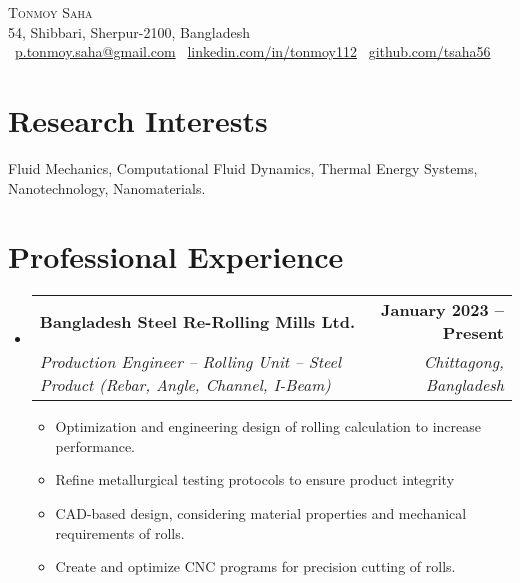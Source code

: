 \documentclass[letterpaper,11pt]{article}
\makeatletter
\newcommand{\resumeItem}[1]{
  \item\small{
    {#1 \vspace{-2pt}}
  }
}
\newcommand{\resumeSubheading}[4]{
  \vspace{-2pt}\item
    \begin{tabular*}{1.0\textwidth}[t]{l@{\extracolsep{\fill}}r}
      \textbf{#1} & \textbf{\small #2} \\
      \textit{\small#3} & \textit{\small #4} \\
    \end{tabular*}\vspace{-5pt}
}
\newcommand{\resumeSubHeadingListStart}{\begin{itemize}[leftmargin=0.0in, label={}]}
\newcommand{\resumeSubHeadingListEnd}{\end{itemize}}
\newcommand{\resumeItemListStart}{\begin{itemize}}
\newcommand{\resumeItemListEnd}{\end{itemize}\vspace{-5pt}}
\makeatother
\begin{document}
\begin{center}
    {\Huge \scshape Tonmoy Saha} \\ \vspace{1pt} 
    54, Shibbari, Sherpur-2100, Bangladesh \\ \vspace{1pt}
    \small \textbar\ \href{mailto:p.tonmoy.saha@gmail.com}{p.tonmoy.saha@gmail.com} \textbar
    \hfill \textbar\ \href{https://www.linkedin.com/in/tonmoy112/}{linkedin.com/in/tonmoy112} \textbar
    \hfill \textbar\ \href{https://github.com/tsaha56}{github.com/tsaha56} \textbar
    \vspace{-2pt}
\end{center}

\section{Research Interests}
{Fluid Mechanics, Computational Fluid Dynamics, Thermal Energy Systems, Nanotechnology, Nanomaterials.}

\section{Professional Experience}
\resumeSubHeadingListStart
\resumeSubheading
{Bangladesh Steel Re-Rolling Mills Ltd.}{January 2023 -- Present}
{Production Engineer -- Rolling Unit -- Steel Product (Rebar, Angle, Channel, I-Beam)}{Chittagong, Bangladesh}
\resumeItemListStart
\resumeItem{Optimization and engineering design of rolling calculation to increase performance.}
\resumeItem{Refine metallurgical testing protocols to ensure product integrity}
\resumeItem{CAD-based design, considering material properties and mechanical requirements of rolls. }
\resumeItem{Create and optimize CNC programs for precision cutting of rolls. }
\resumeItemListEnd
\resumeSubHeadingListEnd
\end{document}
